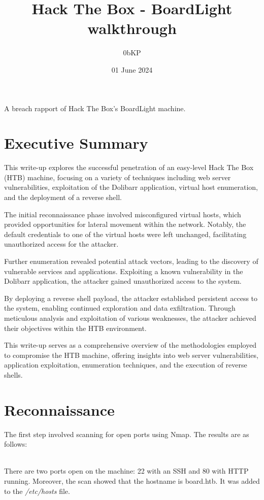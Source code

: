 \documentclass[12pt, letterpaper]{article}
\title{Hack The Box - BoardLight walkthrough}
\author{0bKP}
\date{01 June 2024}
\begin{document}
\maketitle
A breach rapport of Hack The Box's BoardLight machine.

\tableofcontents

\section{Executive Summary}
This write-up explores the successful penetration of an easy-level Hack The Box (HTB) 
machine, focusing on a variety of techniques including web server vulnerabilities,
exploitation of the Dolibarr application, virtual host enumeration, and the deployment 
of a reverse shell.

The initial reconnaissance phase involved misconfigured virtual hosts, which provided 
opportunities for lateral movement within the network. Notably, the default credentials 
to one of the virtual hosts were left unchanged, facilitating unauthorized access for the attacker.

Further enumeration revealed potential attack vectors, leading to the discovery of vulnerable 
services and applications. Exploiting a known vulnerability in the Dolibarr application, the 
attacker gained unauthorized access to the system.

By deploying a reverse shell payload, the attacker established persistent access to the 
system, enabling continued exploration and data exfiltration. Through meticulous analysis 
and exploitation of various weaknesses, the attacker achieved their objectives within the 
HTB environment.

This write-up serves as a comprehensive overview of the methodologies employed to compromise 
the HTB machine, offering insights into web server vulnerabilities, application exploitation, 
enumeration techniques, and the execution of reverse shells.

\section{Reconnaissance}

The first step involved scanning for open ports using Nmap. The results
are as follows: 
\\\\
\noindent   

There are two ports open on the machine: 22 with an SSH and 80 with HTTP running.
Moreover, the scan showed that the hostname is board.htb. It was added to the
\textit{/etc/hosts} file.
\end{document}
